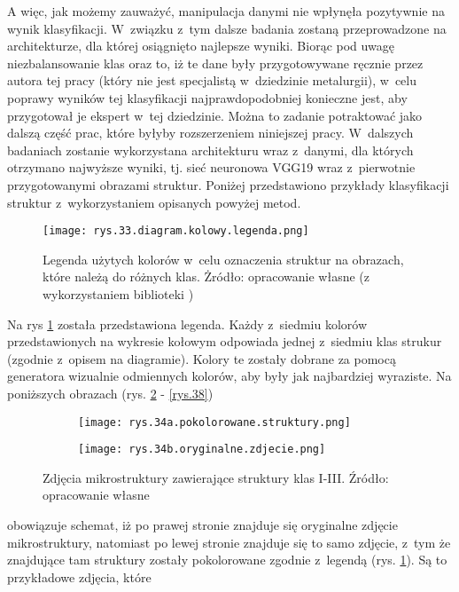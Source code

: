 A więc, jak możemy zauważyć, manipulacja danymi nie wpłynęła pozytywnie na wynik klasyfikacji. W~związku z~tym dalsze badania zostaną przeprowadzone na architekturze, dla której osiągnięto najlepsze wyniki. Biorąc pod uwagę niezbalansowanie klas oraz to, iż te dane były przygotowywane ręcznie przez autora tej pracy (który nie jest specjalistą w~dziedzinie metalurgii), w~celu poprawy wyników tej klasyfikacji najprawdopodobniej konieczne jest, aby przygotował je ekspert w~tej dziedzinie. Można to zadanie potraktować jako dalszą część prac, które byłyby rozszerzeniem niniejszej pracy. W~dalszych badaniach zostanie wykorzystana architekturu wraz z~danymi, dla których otrzymano najwyższe wyniki, tj. sieć neuronowa VGG19 wraz z~pierwotnie przygotowanymi obrazami struktur.
Poniżej przedstawiono przykłady klasyfikacji struktur z~wykorzystaniem opisanych powyżej metod.
\begin{figure}[h]
    \centering
    \texttt{[image: rys.33.diagram.kolowy.legenda.png]} %
    \caption{Legenda użytych kolorów w~celu oznaczenia struktur na obrazach, które należą do różnych klas. Żródło: opracowanie własne (z wykorzystaniem biblioteki )}
    \label{rys.33.diagram.kolowy.legenda.png}
\end{figure}
Na rys \ref{rys.33.diagram.kolowy.legenda.png} została przedstawiona legenda. Każdy z~siedmiu kolorów przedstawionych na wykresie kołowym odpowiada jednej z~siedmiu klas strukur (zgodnie z~opisem na diagramie). Kolory te zostały dobrane za pomocą generatora wizualnie odmiennych kolorów, aby były jak najbardziej wyraziste. Na poniższych obrazach (rys. \ref{rys.34} - \ref{rys.38}) 
\begin{figure}[h]
	\centering
	\begin{subfigure}{0.42\textwidth}
	    \centering
	    \texttt{[image: rys.34a.pokolorowane.struktury.png]}
	\end{subfigure}
	\begin{subfigure}{0.42\textwidth}
	    \centering
	    \texttt{[image: rys.34b.oryginalne.zdjecie.png]}
	\end{subfigure}
	\caption{\label{rys.34}Zdjęcia mikrostruktury zawierające struktury klas I-III. Źródło: opracowanie własne}
\end{figure}
obowiązuje schemat, iż po prawej stronie znajduje się oryginalne zdjęcie mikrostruktury, natomiast po lewej stronie znajduje się to samo zdjęcie, z~tym że znajdujące tam struktury zostały pokolorowane zgodnie z~legendą (rys. \ref{rys.33.diagram.kolowy.legenda.png}). Są to przykładowe zdjęcia, które 

